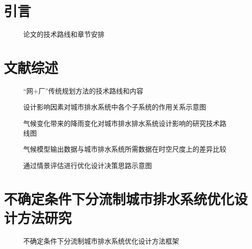 \documentclass[degree=doctor]{thuthesis}
\begin{document}
\START


\frontmatter
\setcounter{page}{3}
\showoutput
\listoffigures
\clearpage
\OMIT


\mainmatter
\chapter{引言}

\clearpage
\setcounter{page}{10}
\begin{figure}
  \centering
  \caption{论文的技术路线和章节安排}
\end{figure}


\chapter{文献综述}

\clearpage
\setcounter{page}{19}
\begin{figure}
  \centering
  \caption{“网+厂”传统规划方法的技术路线和内容}
\end{figure}

\clearpage
\setcounter{page}{28}
\begin{figure}
  \centering
  \caption{设计影响因素对城市排水系统中各个子系统的作用关系示意图}
\end{figure}

\clearpage
\setcounter{page}{29}
\begin{figure}
  \centering
  \caption{气候变化带来的降雨变化对城市排水排水系统设计影响的研究技术路线图}
\end{figure}

\clearpage
\setcounter{page}{30}
\begin{figure}
  \centering
  \caption{气候模型输出数据与城市排水系统所需数据在时空尺度上的差异比较}
\end{figure}

\clearpage
\setcounter{page}{33}
\begin{figure}
  \centering
  \caption{通过情景评估进行优化设计决策思路示意图}
\end{figure}


\chapter{不确定条件下分流制城市排水系统优化设计方法研究}

\clearpage
\setcounter{page}{42}
\begin{figure}
  \centering
  \caption{不确定条件下分流制城市排水系统优化设计方法框架}
\end{figure}
\end{document}
